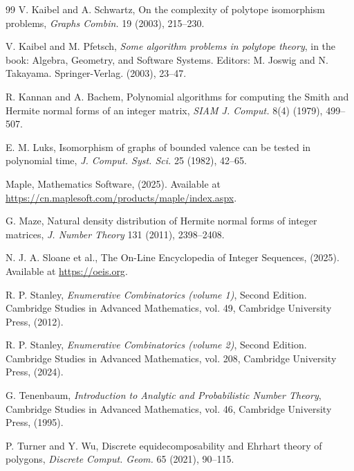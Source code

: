 \documentclass[reqno, 12pt]{article}
\theoremstyle{mydefinition}
\theoremstyle{myremark}
\numberwithin{algorithm}{section}
\begin{document}
\begin{thebibliography}{99}
 V. Kaibel and A. Schwartz, On the complexity of polytope isomorphism problems, \emph{Graphs Combin.} 19 (2003), 215--230.

 V. Kaibel and M. Pfetsch, \emph{Some algorithm problems in polytope theory}, in the book: Algebra, Geometry, and Software Systems. Editors: M. Joswig and N. Takayama. Springer-Verlag. (2003), 23--47.

 R. Kannan and A. Bachem, Polynomial algorithms for computing the Smith and Hermite normal forms of an integer matrix, \emph{SIAM J. Comput.} 8(4) (1979), 499--507.

 E. M. Luks, Isomorphism of graphs of bounded valence can be tested in polynomial time, \emph{J. Comput. Syst. Sci.} 25 (1982), 42--65.

 Maple, Mathematics Software, (2025). Available at \url{https://cn.maplesoft.com/products/maple/index.aspx}.

 G. Maze, Natural density distribution of Hermite normal forms of integer matrices, \emph{J. Number Theory} 131 (2011), 2398–2408.


 N. J. A. Sloane et al., The On-Line Encyclopedia of Integer Sequences, (2025). Available at \url{https://oeis.org}.

 R. P. Stanley, \emph{Enumerative Combinatorics (volume 1)}, Second Edition. Cambridge Studies in Advanced Mathematics, vol. 49, Cambridge University Press, (2012).

 R. P. Stanley, \emph{Enumerative Combinatorics (volume 2)}, Second Edition. Cambridge Studies in Advanced Mathematics, vol. 208, Cambridge University Press, (2024).

 G. Tenenbaum, \emph{Introduction to Analytic and Probabilistic Number Theory}, Cambridge Studies in Advanced Mathematics, vol. 46, Cambridge University Press, (1995).

 P. Turner and Y. Wu, Discrete equidecomposability and Ehrhart theory of polygons, \emph{Discrete Comput. Geom.} 65 (2021), 90--115.


\end{thebibliography}
\end{document}
